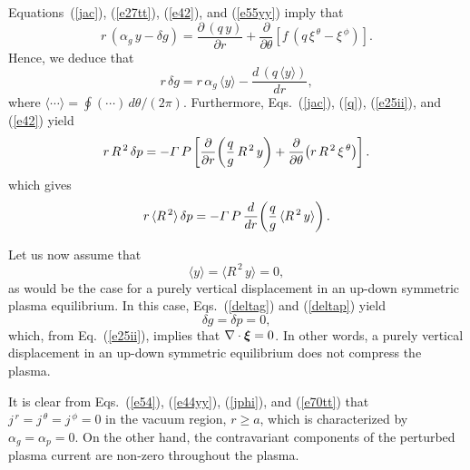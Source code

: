 \documentclass[12pt,prb,aps]{revtex4-1}
\newcommand {\bxi}{\mbox{\boldmath$\xi$}}
\begin{document}
Equations~(\ref{jac}), (\ref{e27tt}), (\ref{e42}), and (\ref{e55yy}) imply that
\begin{equation}
r\,(\alpha_g\,y-\delta g) = \frac{\partial\,(q\,y)}{\partial r} + \frac{\partial}{\partial\theta}\!\left[f\,(q\,\xi^{\,\theta}-\xi^{\,\phi})\right].
\end{equation}
Hence, we deduce that
\begin{equation}\label{deltag}
r\,\delta g = r\,\alpha_g\,\langle y\rangle - \frac{d\,(q\,\langle y\rangle)}{dr},
\end{equation}
where $\langle \cdots\rangle = \oint(\cdots)\,d\theta/(2\pi)$. Furthermore, Eqs.~(\ref{jac}), (\ref{q}), (\ref{e25ii}), and (\ref{e42})   yield\,\cite{tj}
\begin{equation}
r\,R^{\,2}\,\delta p = - {\mit\Gamma}\,P\left[\frac{\partial}{\partial r}\!\left(\frac{q}{g}\,R^{\,2}\,y\right)+\frac{\partial}{\partial\theta}\!\left(r\,R^{\,2}\,\xi^{\,\theta}\right)\right].
\end{equation}
which gives
\begin{equation}\label{deltap}
r\,\langle R^{\,2}\rangle\,\delta p = -{\mit\Gamma}\,P\,\frac{d}{dr}\!\left(\frac{q}{g}\,\langle R^{\,2}\,y\rangle\right).
\end{equation}

Let us now assume that 
\begin{equation}\label{sym}
\langle y\rangle = \langle R^{\,2}\,y\rangle = 0,
\end{equation}
as would be the case for a purely vertical displacement in an up-down symmetric plasma equilibrium.\cite{f1}
In this case, Eqs.~(\ref{deltag}) and (\ref{deltap}) yield 
\begin{equation}\label{e70tt}
\delta g = \delta p = 0,
\end{equation}
 which, from Eq.~(\ref{e25ii}),  implies that $\nabla\cdot\bxi=0$. In other words, a purely vertical displacement in an up-down
symmetric equilibrium does not compress the plasma. 

It is clear from Eqs.~(\ref{e54}), (\ref{e44yy}), (\ref{jphi}), and (\ref{e70tt}) that $j^{\,r}=j^{\,\theta}=j^{\,\phi}=0$ in the vacuum region, $r\geq a$, which is characterized by $\alpha_g=\alpha_p=0$. On the
other hand, the contravariant components of the perturbed plasma current are  non-zero throughout the plasma. 
\end{document}
